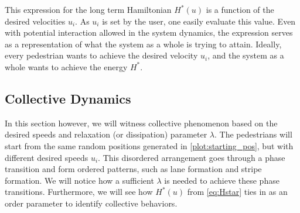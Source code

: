 \begin{itemize}
This expression for the long term Hamiltonian $H^*(u)$ is a function of the desired velocities $u_i$. As $u_i$ is set by the user, one easily evaluate this value. Even with potential interaction allowed in the system dynamics, the expression serves as a representation of what the system as a whole is trying to attain. Ideally, every pedestrian wants to achieve the desired velocity $u_i$, and the system as a whole wants to achieve the energy $H^*$. 
\end{itemize}



\subsection{Collective Dynamics}
\label{section:collective}

In this section however, we will witness collective phenomenon based on the desired speeds and relaxation (or dissipation) parameter $\lambda$. The pedestrians will start from the same random positions generated in \autoref{plot:starting_pos}, but with different desired speeds $u_i$. This disordered arrangement goes through a phase transition and form ordered patterns, such as lane formation and stripe formation. We will notice how a sufficient $\lambda$ is needed to achieve these phase transitions. Furthermore, we will see how $H^*(u)$ from \autoref{eq:Hstar} ties in as an order parameter to identify collective behaviors.
